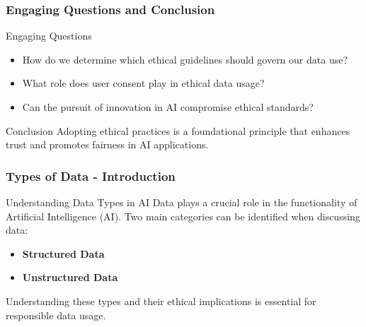 \documentclass[aspectratio=169]{beamer}
\begin{document}
\begin{frame}[fragile]
    \frametitle{Engaging Questions and Conclusion}
    
    \begin{block}{Engaging Questions}
        \begin{itemize}
            \item How do we determine which ethical guidelines should govern our data use?
            \item What role does user consent play in ethical data usage?
            \item Can the pursuit of innovation in AI compromise ethical standards?
        \end{itemize}
    \end{block}

    \begin{block}{Conclusion}
        Adopting ethical practices is a foundational principle that enhances trust and promotes fairness in AI applications.
    \end{block}
\end{frame}

\begin{frame}[fragile]
    \frametitle{Types of Data - Introduction}
    \begin{block}{Understanding Data Types in AI}
        Data plays a crucial role in the functionality of Artificial Intelligence (AI). Two main categories can be identified when discussing data:
        \begin{itemize}
            \item \textbf{Structured Data}
            \item \textbf{Unstructured Data}
        \end{itemize}
        Understanding these types and their ethical implications is essential for responsible data usage.
    \end{block}
\end{frame}
\end{document}
